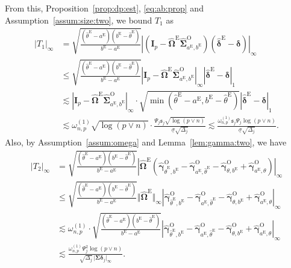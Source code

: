 \documentclass[11pt, a4paper]{article}
\newcommand{\mbf}{\mathbf}
\renewcommand{\l}{\left}
\renewcommand{\r}{\right}
\def\wh{\widehat}
\newcommand{\cp}{\theta}
\newcommand{\nn}{\nonumber}
\newcommand{\tE}{\text{E}}
\newcommand{\tO}{\text{O}}
\theoremstyle{definition}
\theoremstyle{definition}
\theoremstyle{definition}
\theoremstyle{definition}
\theoremstyle{definition}
\theoremstyle{remark}
\theoremstyle{definition}
\theoremstyle{definition}
\theoremstyle{definition}
\begin{document}
From this, Proposition~\ref{prop:dp:est}, \eqref{eq:ab:prop} and Assumption~\ref{assum:size:two}, we bound $T_1$ as 
\begin{align}
\vert T_1 \vert_\infty & = \sqrt{\frac{ (\wh\cp^{\tE} - a^{\tE}) (b^{\tE} - \wh\cp^{\tE}) }{ b^{\tE} - a^{\tE} }}\l\vert \l( \mbf I_p - \wh{\bm\Omega}^{\tE} \wh{\bm\Sigma}^{\tO}_{a^{\tE}, b^{\tE}} \r) \l( \wh{\bm\delta}^{\tE} - \bm\delta \r)\r\vert_{\infty} \nn \\
& \le \sqrt{\frac{ (\wh\cp^{\tE} - a^{\tE}) (b^{\tE} - \wh\cp^{\tE}) }{ b^{\tE} - a^{\tE} }}\l\vert  \mbf I_p - \wh{\bm\Omega}^{\tE} \wh{\bm\Sigma}^{\tO}_{a^{\tE}, b^{\tE}} \r\vert_{\infty} \l\vert \wh{\bm\delta}^{\tE} - \bm\delta \r\vert_{1} \nn \\
& \lesssim \l\vert \mbf I_p - \wh{\bm\Omega}^{\tE} \wh{\bm\Sigma}^{\tO}_{a^{\tE}, b^{\tE}} \r\vert_{\infty}\cdot\sqrt{\min(\wh\cp^{\tE} - a^{\tE}, b^{\tE} - \wh\cp^{\tE})}\l\vert \wh{\bm\delta}^{\tE} - \bm\delta \r\vert_{1} 
\nn \\
& \lesssim \omega^{(1)}_{n, p} \sqrt{\log(p \vee n)} \cdot \frac{\Psi_j \mathfrak{s}_j \sqrt{\log(p \vee n)}}{\underline{\sigma}\sqrt{\Delta_j}}
\lesssim \frac{\omega^{(1)}_{n, p} \mathfrak{s}_j \Psi_j \log(p \vee n)}{\underline{\sigma}\sqrt{\Delta_j}}.
\label{eq:t1:bound}
\end{align}
Also, by Assumption~\ref{assum:omega} and Lemma~\ref{lem:gamma:two}, we have 
\begin{align}
\vert T_2 \vert_\infty & = \sqrt{\frac{ (\wh\cp^{\tE} - a^{\tE}) (b^{\tE} - \wh\cp^{\tE}) }{ b^{\tE} - a^{\tE} }} \l\vert\wh{\bm\Omega}^{\tE} \l( \wh{\bm\gamma}^{\tO}_{\wh\cp^{\tE}, b^{\tE}} - \wh{\bm\gamma}^{\tO}_{a^{\tE}, \wh\cp^{\tE}} - \wh{\bm\gamma}^{\tO}_{\cp, b^{\tE}} + \wh{\bm\gamma}^{\tO}_{a^{\tE}, \cp} \r)\r\vert_{\infty} 
\nn \\
& \le \sqrt{\frac{ (\wh\cp^{\tE} - a^{\tE}) (b^{\tE} - \wh\cp^{\tE}) }{ b^{\tE} - a^{\tE} }} \Vert \wh{\bm\Omega}^{\tE}\Vert_{\infty}\l\vert  \wh{\bm\gamma}^{\tO}_{\wh\cp^{\tE}, b^{\tE}} - \wh{\bm\gamma}^{\tO}_{a^{\tE}, \wh\cp^{\tE}} - \wh{\bm\gamma}^{\tO}_{\cp, b^{\tE}} + \wh{\bm\gamma}^{\tO}_{a^{\tE}, \cp}\r\vert_{\infty} 
\nn \\
& \lesssim \omega^{(1)}_{n, p} \cdot \sqrt{\frac{ (\wh\cp^{\tE} - a^{\tE}) (b^{\tE} - \wh\cp^{\tE}) }{ b^{\tE} - a^{\tE} }} \l\vert  \wh{\bm\gamma}^{\tO}_{\wh\cp^{\tE}, b^{\tE}} - \wh{\bm\gamma}^{\tO}_{a^{\tE}, \wh\cp^{\tE}} - \wh{\bm\gamma}^{\tO}_{\cp, b^{\tE}} + \wh{\bm\gamma}^{\tO}_{a^{\tE}, \cp}\r\vert_{\infty} 
\nn \\
& \lesssim \frac{\omega^{(1)}_{n, p} \Psi_j^2 \log(p \vee n)}{\sqrt{\Delta_j} \,\vert \bm\Sigma \bm\delta_j \vert_\infty}.
\label{eq:t2:bound}
\end{align}
\end{document}
